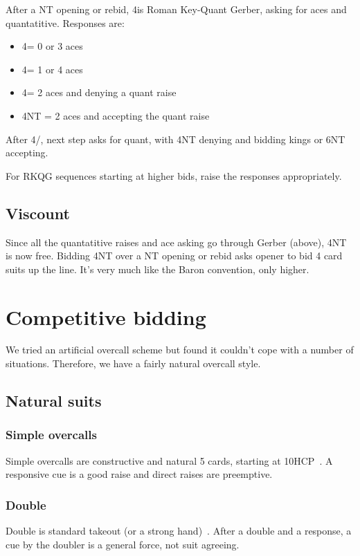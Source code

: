 \documentclass[a4paper,14pt]{extarticle}
\begin{document}
After a NT opening or rebid, 4\clubs is Roman Key-Quant Gerber, asking for
aces and quantatitive. Responses are:

\begin{itemize}
	\item 4\diamonds = 0 or 3 aces
	\item 4\hearts = 1 or 4 aces
	\item 4\spades = 2 aces and denying a quant raise
	\item 4NT = 2 aces and accepting the quant raise
\end{itemize}

After 4\diamonds/\hearts, next step asks for quant, with 4NT denying
and bidding kings or 6NT accepting.

For RKQG sequences starting at higher bids, raise the responses appropriately.

\subsection{Viscount}
\label{sec:viscount}
\label{note:23}

Since all the quantatitive raises and ace asking go through Gerber (above), 4NT
is now free. Bidding 4NT over a NT opening or rebid asks opener to bid 4 card
suits up the line. It's very much like the Baron convention, only higher.

\section{Competitive bidding}
\label{sec:competitive}

We tried an artificial overcall scheme but found it couldn't cope with a number of situations.
Therefore, we have a fairly natural overcall style.

\subsection{Natural suits}
\label{sec:def:1x}

\subsubsection{Simple overcalls}
\label{note:11}
Simple overcalls are constructive and natural 5 cards, starting at
10HCP~. A responsive cue is a good raise and
direct raises are preemptive.

\subsubsection{Double}
Double is standard takeout (or a strong hand)~. After a double and
a response, a cue by the doubler is a general force, not suit agreeing.
\end{document}
